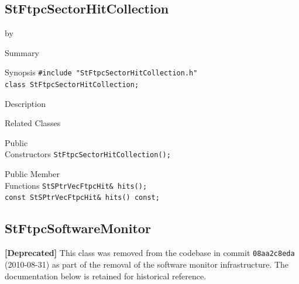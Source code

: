 \documentclass[twoside]{article}
\newcommand{\entrylabel}[1]{\mbox{\textbf{{#1}}}\hfil}%
\newenvironment{entry}
{\begin{list}{}%
    {\renewcommand{\makelabel}{\entrylabel}%
     \setlength{\labelwidth}{90pt}%
     \setlength{\leftmargin}{\labelwidth}
     \advance\leftmargin by \labelsep%
      }%
    }%
  {\end{list}}
\newcommand{\Entrylabel}[1]%
{\raisebox{0pt}[1ex][0pt]{\makebox[\labelwidth][l]%
    {\parbox[t]{\labelwidth}{\hspace{0pt}\textbf{{#1}}}}}}
\newenvironment{Entry}%
{\renewcommand{\entrylabel}{\Entrylabel}\begin{entry}}%
  {\end{entry}}
\begin{document}
\subsection{StFtpcSectorHitCollection}
\label{sec:StFtpcSectorHitCollection}
\begin{Entry}
\item[Summary]
\item[Synopsis]
    \verb+#include "StFtpcSectorHitCollection.h"+\\
    \verb+class StFtpcSectorHitCollection;+\\
\item[Description]
\item[Related Classes]
\item[Public\\ Constructors]
    \verb+StFtpcSectorHitCollection();+\\
\item[Public Member\\ Functions]
    \verb+StSPtrVecFtpcHit& hits();+\\
    
    \verb+const StSPtrVecFtpcHit& hits() const;+\\
\end{Entry}
\clearpage


\subsection{StFtpcSoftwareMonitor}
\label{sec:StFtpcSoftwareMonitor}
\textbf{[Deprecated]} This class was removed from the codebase in commit
\texttt{08aa2c8eda} (2010-08-31) as part of the removal of the software monitor
infrastructure.
The documentation below is retained for historical reference.
\end{document}
